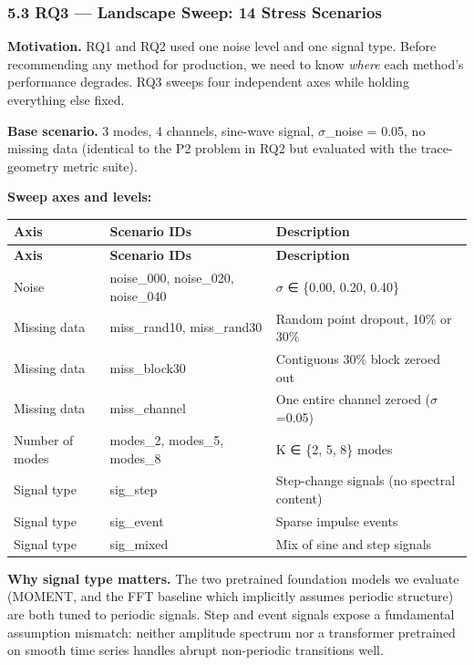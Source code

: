 \documentclass[11pt,a4paper]{article}
\begin{document}
\subsubsection{5.3 RQ3 --- Landscape Sweep: 14 Stress Scenarios}

\textbf{Motivation.} RQ1 and RQ2 used one noise level and one signal type. Before recommending any
method for production, we need to know \textit{where} each method's performance degrades. RQ3 sweeps
four independent axes while holding everything else fixed.

\textbf{Base scenario.} 3 modes, 4 channels, sine-wave signal, $\sigma$\_noise = 0.05, no missing data
(identical to the P2 problem in RQ2 but evaluated with the trace-geometry metric suite).

\textbf{Sweep axes and levels:}

\begin{longtable}{|l|l|l|}
\hline
\textbf{Axis} & \textbf{Scenario IDs} & \textbf{Description} \\
\hline
\endfirsthead
\hline
\textbf{Axis} & \textbf{Scenario IDs} & \textbf{Description} \\
\hline
\endhead
\hline
\endfoot
Noise & noise\_000, noise\_020, noise\_040 & $\sigma$ ∈ \{0.00, 0.20, 0.40\} \\
\hline
Missing data & miss\_rand10, miss\_rand30 & Random point dropout, 10\% or 30\% \\
\hline
Missing data & miss\_block30 & Contiguous 30\% block zeroed out \\
\hline
Missing data & miss\_channel & One entire channel zeroed ($\sigma$=0.05) \\
\hline
Number of modes & modes\_2, modes\_5, modes\_8 & K ∈ \{2, 5, 8\} modes \\
\hline
Signal type & sig\_step & Step-change signals (no spectral content) \\
\hline
Signal type & sig\_event & Sparse impulse events \\
\hline
Signal type & sig\_mixed & Mix of sine and step signals \\
\hline
\end{longtable}

\textbf{Why signal type matters.} The two pretrained foundation models we evaluate (MOMENT, and the
FFT baseline which implicitly assumes periodic structure) are both tuned to periodic signals.
Step and event signals expose a fundamental assumption mismatch: neither amplitude spectrum nor
a transformer pretrained on smooth time series handles abrupt non-periodic transitions well.
\end{document}
